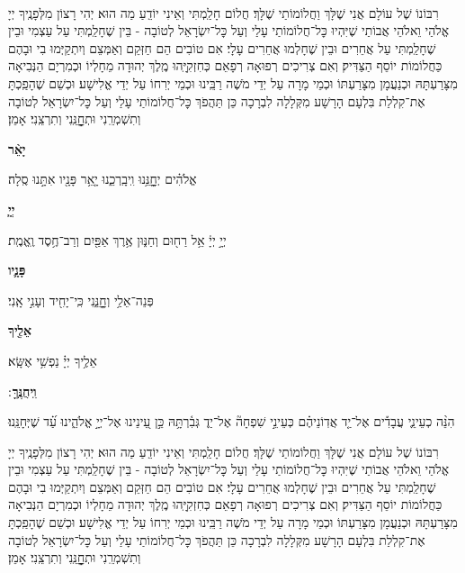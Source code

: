 \documentclass[twoside, openany, parskip=half, 11pt]{book}
\begin{document}
\\

רִבּוֹנוֹ שֶׁל עוֹלָם אֲנִי שֶׁלָּךְ וַחֲלוֹמוֹתַי שֶׁלָּךְ׃ חֲלוֹם חָלַֽמְתִּי וְאֵינִי יוֹדֵֽעַ מַה הוּא׃ יְהִי רָצוֹן מִלְּפָנֶֽיךָ יְיָ אֱלֹהַי וֵאלֹהֵי אֲבוֹתַי שֶׁיִּהְיוּ כׇּל־חֲלוֹמוֹתַי עָלַי וְעַל כׇּל־יִשְׂרָאֵל לְטוֹבָה - בֵּין שֶׁחָלַֽמְתִּי עַל עַצְמִי וּבֵין שֶׁחָלַֽמְתִּי עַל אֲחֵרִים וּבֵין שֶׁחָלְמוּ אֲחֵרִים עָלָי׃ אִם טוֹבִים הֵם חַזְּקֵם וְאַמְּצֵם וְיִתְקַיְּמוּ בִי וּבָהֶם כַּחֲלוֹמוֹת יוֹסֵף הַצַּדִּיק׃ וְאִם צְרִיכִים רְפוּאָה רְפָאֵם כְּחִזְקִיָּֽהוּ מֶֽלֶךְ יְהוּדָה מֵחָלְיוֹ וּכְמִרְיָם הַנְּבִיאָה מִצָּרַעְתָּהּ וּכְנַעֲמָן מִצָּרַעְתּוֹ וּכְמֵי מָרָה עַל יְדֵי מֹשֶׁה רַבֵּֽינוּ וּכְמֵי יְרִחוֹ עַל יְדֵי אֱלִישָׁע׃ וּכְשֵׁם שֶׁהָפַֽכְתָּ אֶת־קִלְלַת בִּלְעָם הָרָשָׁע מִקְּלָלָה לִבְרָכָה כֵּן תַּהֲפֹךְ כׇּל־חֲלוֹמוֹתַי עָלַי וְעַל כׇּל־יִשְׂרָאֵל לְטוֹבָה וְתִשְׁמְרֵֽנִי וּתְחׇׇׇׇׇׇנֵּֽנִי וְתִרְצֵֽנִי׃ אָמֵן׃



\textbf{יָאֵ֨ר}
\hfill \begin{footnotesize}
אֱלֹהִ֗ים יְחׇׇׇׇנֵּ֥נוּ וִֽיבָֽרְכֵ֑נוּ יָ֤אֵ֥ר פָּנָ֖יו אִתָּ֣נוּ סֶֽלָה׃\\
\end{footnotesize}
\textbf{יְיָ֧}
\hfill \begin{footnotesize}
יְיָ֣ יְיָ֔ אֵ֥ל רַח֖וּם וְחַנּ֑וּן אֶ֥רֶךְ אַפַּ֖יִם וְרַב־חֶ֥סֶד וֶֽאֱמֶֽת׃\\
\end{footnotesize}
\textbf{פָּנָ֛יו}
\hfill \begin{footnotesize}
פְּנֵה־אֵלַ֥י וְחׇׇׇׇׇנֵּ֑נִי כִּֽי־יָחִ֖יד וְעָנִ֣י אָֽנִי׃\\
\end{footnotesize}
\textbf{אֵלֶ֖יךָ}
\hfill \begin{footnotesize}
אֵלֶ֥יךָ יְיָ֗ נַפְשִׁ֥י אֶשָּֽׂא׃\\
\end{footnotesize}
\textbf{וִֽיחֻנֶּֽךָּ}
׃ \hfill \begin{footnotesize}
הִנֵּ֨ה כְעֵינֵ֢י עֲבָדִ֡ים אֶל־יַ֤ד אֲדֽוֹנֵיהֶ֗ם כְּעֵינֵ֣י שִׁפְחָה֘ אֶל־יַד֢ גְּבִ֫רְתָּ֥הּ כֵּ֣ן עֵ֭ינֵינוּ אֶל־יְיָ֣ אֱלֹהֵ֑ינוּ עַ֝֗ד שֶׁיְּחָנֵּֽנוּ׃
\end{footnotesize}


רִבּוֹנוֹ שֶׁל עוֹלָם אֲנִי שֶׁלָּךְ וַחֲלוֹמוֹתַי שֶׁלָּךְ׃ חֲלוֹם חָלַֽמְתִּי וְאֵינִי יוֹדֵֽעַ מַה הוּא׃ יְהִי רָצוֹן מִלְּפָנֶֽיךָ יְיָ אֱלֹהַי וֵאלֹהֵי אֲבוֹתַי שֶׁיִּהְיוּ כׇּל־חֲלוֹמוֹתַי עָלַי וְעַל כׇּל־יִשְׂרָאֵל לְטוֹבָה - בֵּין שֶׁחָלַֽמְתִּי עַל עַצְמִי וּבֵין שֶׁחָלַֽמְתִּי עַל אֲחֵרִים וּבֵין שֶׁחָלְמוּ אֲחֵרִים עָלָי׃ אִם טוֹבִים הֵם חַזְּקֵם וְאַמְּצֵם וְיִתְקַיְּמוּ בִי וּבָהֶם כַּחֲלוֹמוֹת יוֹסֵף הַצַּדִּיק׃ וְאִם צְרִיכִים רְפוּאָה רְפָאֵם כְּחִזְקִיָּֽהוּ מֶֽלֶךְ יְהוּדָה מֵחָלְיוֹ וּכְמִרְיָם הַנְּבִיאָה מִצָּרַעְתָּהּ וּכְנַעֲמָן מִצָּרַעְתּוֹ וּכְמֵי מָרָה עַל יְדֵי מֹשֶׁה רַבֵּֽינוּ וּכְמֵי יְרִחוֹ עַל יְדֵי אֱלִישָׁע׃ וּכְשֵׁם שֶׁהָפַֽכְתָּ אֶת־קִלְלַת בִּלְעָם הָרָשָׁע מִקְּלָלָה לִבְרָכָה כֵּן תַּהֲפֹךְ כׇּל־חֲלוֹמוֹתַי עָלַי וְעַל כׇּל־יִשְׂרָאֵל לְטוֹבָה וְתִשְׁמְרֵֽנִי וּתְחׇׇׇׇׇׇנֵּֽנִי וְתִרְצֵֽנִי׃ אָמֵן׃
\end{document}

